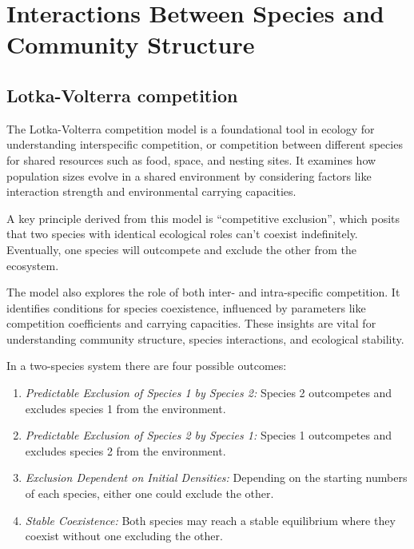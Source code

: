 \documentclass[
  a4paper]{book}
\providecommand{\tightlist}{%
  \setlength{\itemsep}{0pt}\setlength{\parskip}{0pt}}
\begin{document}
\part{Interactions Between Species and Community Structure}\label{part-interactions-between-species-and-community-structure}

\chapter{Lotka-Volterra competition}\label{lotka-volterra-competition}

The Lotka-Volterra competition model is a foundational tool in ecology for understanding interspecific competition, or competition between different species for shared resources such as food, space, and nesting sites. It examines how population sizes evolve in a shared environment by considering factors like interaction strength and environmental carrying capacities.

A key principle derived from this model is ``competitive exclusion'', which posits that two species with identical ecological roles can't coexist indefinitely. Eventually, one species will outcompete and exclude the other from the ecosystem.

The model also explores the role of both inter- and intra-specific competition. It identifies conditions for species coexistence, influenced by parameters like competition coefficients and carrying capacities. These insights are vital for understanding community structure, species interactions, and ecological stability.

In a two-species system there are four possible outcomes:

\begin{enumerate}
\def\labelenumi{\arabic{enumi}.}
\tightlist
\item
  \emph{Predictable Exclusion of Species 1 by Species 2:} Species 2 outcompetes and excludes species 1 from the environment.
\item
  \emph{Predictable Exclusion of Species 2 by Species 1:} Species 1 outcompetes and excludes species 2 from the environment.
\item
  \emph{Exclusion Dependent on Initial Densities:} Depending on the starting numbers of each species, either one could exclude the other.
\item
  \emph{Stable Coexistence:} Both species may reach a stable equilibrium where they coexist without one excluding the other.
\end{enumerate}
\end{document}

